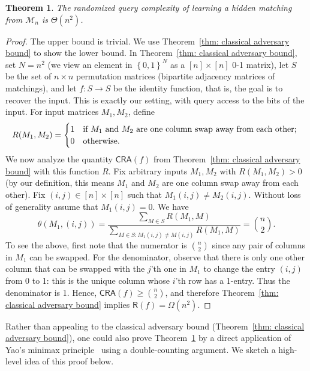 \documentclass[11pt]{article}
\newcommand{\cM}{\mathcal{M}}
\newcommand{\sR}{\mathsf{R}}
\newcommand{\set}[1]{\left\{ #1 \right\}}
\newcommand{\zone}{\set{0,1}}
\newtheorem{theorem}{Theorem}[section]
\begin{document}
\begin{theorem}\label{thm:rand-lb-matching}
The randomized query complexity of learning a hidden matching from $\cM_n$ is $\Theta(n^2)$.
\end{theorem}
\begin{proof}
The upper bound is trivial. 
We use Theorem~\ref{thm: classical adversary bound} to show the lower bound. In Theorem~\ref{thm: classical adversary bound}, set $N = n^2$ (we view an element in $\zone^{N}$ as a $[n] \times [n]$ 0-1 matrix), let $S$ be the set of $n \times n$ permutation matrices (bipartite adjacency matrices of matchings), and let $f : S \to S$ be the identity function, that is, the goal is to recover the input. This is exactly our setting, with query access to the bits of the input. For input matrices $M_1, M_2$, define 
$$
R(M_1, M_2) = \begin{cases}
    1 & \text{if } M_1 \textnormal{ and } M_2 \textnormal{ are one column swap away from each other; }\\
    0 & \textnormal{otherwise}.
\end{cases}
$$
We now analyze the quantity $\mathsf{CRA}(f)$ from Theorem~\ref{thm: classical adversary bound} with this function $R$. Fix arbitrary inputs $M_1, M_2$ with $R(M_1, M_2) > 0$ (by our definition, this means $M_1$ and $M_2$ are one column swap away from each other). Fix $(i, j) \in [n] \times [n]$ such that $M_1(i, j) \neq M_2(i, j)$. Without loss of generality assume that $M_1(i, j) = 0$. We have
$$
\theta(M_1, (i, j)) = \frac{\sum_{M \in S} R(M_1, M)}{\sum_{M \in S : M_1(i, j) \neq M(i, j)} R(M_1, M)} = \binom{n}{2}.
$$
To see the above, first note that the numerator is $\binom{n}{2}$ since any pair of columns in $M_1$ can be swapped. For the denominator, observe that there is only one other column that can be swapped with the $j$'th one in $M_1$ to change the entry $(i,j)$ from 0 to 1: this is the unique column whose $i$'th row has a 1-entry. Thus the denominator is 1.
Hence, $\mathsf{CRA}(f) \geq \binom{n}{2}$, and therefore Theorem~\ref{thm: classical adversary bound} implies $\sR(f) = \Omega(n^2)$.
\end{proof}

Rather than appealing to the classical adversary bound (Theorem~\ref{thm: classical adversary bound}), one could also prove Theorem~\ref{thm:rand-lb-matching} by a direct application of Yao's minimax principle~\cite{Yao77} using a double-counting argument. We sketch a high-level idea of this proof below.
\end{document}
